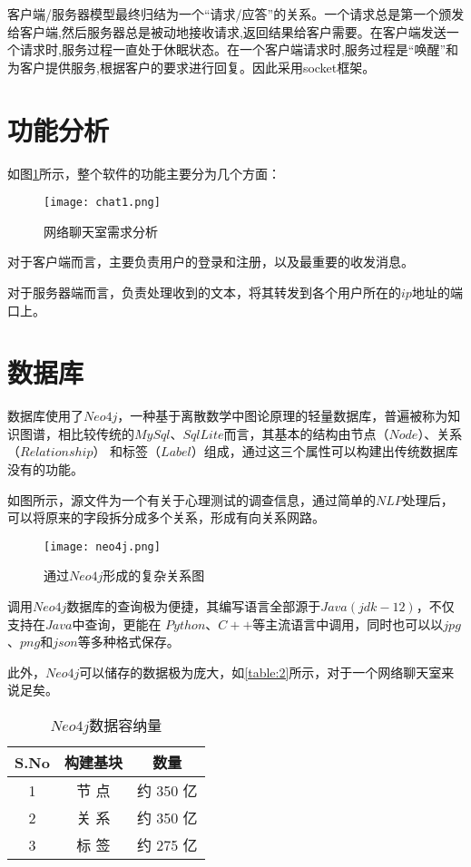 \documentclass[forprint]{OSPaper}
\begin{document}
客户端/服务器模型最终归结为一个“请求/应答”的关系。一个请求总是第一个颁发给客户端,然后服务器总是被动地接收请求,返回结果给客户需要。在客户端发送一个请求时,服务过程一直处于休眠状态。在一个客户端请求时,服务过程是“唤醒”和为客户提供服务,根据客户的要求进行回复。因此采用socket框架。
\section{功能分析}

如图\ref{fig:6}所示，整个软件的功能主要分为几个方面：

\begin{figure}[ht]
	\centering
	\texttt{[image: chat1.png]}
	\caption{网络聊天室需求分析}
	\label{fig:6}
\end{figure}

对于客户端而言，主要负责用户的登录和注册，以及最重要的收发消息。

对于服务器端而言，负责处理收到的文本，将其转发到各个用户所在的$ip$地址的端口上。
\section{数据库}

数据库使用了$ Neo4j $，一种基于离散数学中图论原理的轻量数据库，普遍被称为知识图谱，相比较传统的$MySql$、$SqlLite$而言，其基本的结构由节点（$Node$）、关系（$Relationship$）
和标签（$Label$）组成，通过这三个属性可以构建出传统数据库没有的功能。

如图所示，源文件为一个有关于心理测试的调查信息，通过简单的$NLP$处理后，可以将原来的字段拆分成多个关系，形成有向关系网路。

\begin{figure}[ht]
	\centering
	\texttt{[image: neo4j.png]}
	\caption{通过$ Neo4j $形成的复杂关系图}
	\label{fig:7}
\end{figure}
调用$Neo4j$数据库的查询极为便捷，其编写语言全部源于$ Java (jdk-12)$，不仅支持在$Java$中查询，更能在
$ Python $、$C++$等主流语言中调用，同时也可以以$jpg$、$png$和$json$等多种格式保存。

此外，$Neo4j$可以储存的数据极为庞大，如\ref{table:2}所示，对于一个网络聊天室来说足矣。

\begin{table}[ht]\centering
	\caption{$Neo4j$数据容纳量}
	\label{table:3}
	\begin{tabular}{ccc}
		\hline
		S.No & 构建基块 & 数量      \\ \hline
		1    & 节  点 & 约 350 亿 \\
		2    & 关  系 & 约 350 亿 \\
		3    & 标  签 & 约 275 亿 \\ \hline
		
	\end{tabular}
\end{table}
\end{document}
